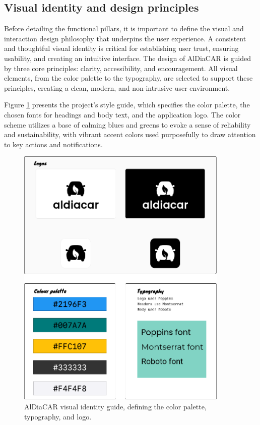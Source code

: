 \subsection{Visual identity and design principles}

Before detailing the functional pillars, it is important to define the visual and interaction design philosophy that underpins the user experience. A consistent and thoughtful visual identity is critical for establishing user trust, ensuring usability, and creating an intuitive interface. The design of AlDiaCAR is guided by three core principles: clarity, accessibility, and encouragement. All visual elements, from the color palette to the typography, are selected to support these principles, creating a clean, modern, and non-intrusive user environment.

\textgap

Figure \ref{fig:visual-identity} presents the project's style guide, which specifies the color palette, the chosen fonts for headings and body text, and the application logo. The color scheme utilizes a base of calming blues and greens to evoke a sense of reliability and sustainability, with vibrant accent colors used purposefully to draw attention to key actions and notifications.

\begin{figure}[H]
\centering
\includegraphics[width=0.9\textwidth]{images/branding/moodboard.png}
\caption{AlDiaCAR visual identity guide, defining the color palette, typography, and logo.}
\label{fig:visual-identity}
\end{figure}

